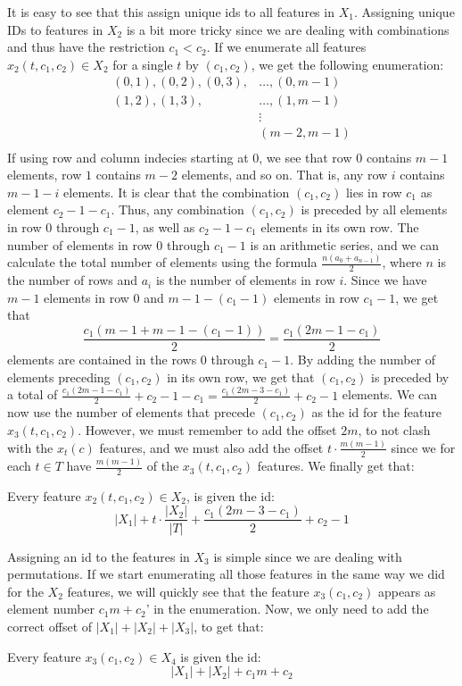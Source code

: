 It is easy to see that this assign unique ids to all features in $X_1$.
Assigning unique IDs to features in $X_2$ is a bit more tricky since we are dealing with combinations and thus have the restriction $c_1 < c_2$.
If we enumerate all features $x_2(t, c_1, c_2) \in X_2$ for a single $t$ by $(c_1, c_2)$, we get the following enumeration:
\begin{align*}
(0, 1), (0, 2), (0, 3),& \dots, (0, m-1)\\
        (1, 2), (1, 3),& \dots, (1, m-1)\\
                        & \vdots    \\
                         &      (m-2, m-1)\\                   
\end{align*}
If using row and column indecies starting at $0$, we see that row $0$ contains $m-1$ elements, row $1$ contains $m-2$ elements, and so on.
That is, any row $i$ contains $m-1-i$ elements.
It is clear that the combination $(c_1, c_2)$ lies in row $c_1$ as element $c_2 - 1 - c_1$.
Thus, any combination $(c_1, c_2)$ is preceded by all elements in row $0$ through $c_1 - 1$, as well as $c_2 - 1 - c_1$ elements in its own row.
The number of elements in row $0$ through $c_1 - 1$ is an arithmetic series, and we can calculate the total number of elements
using the formula $\frac{n(a_0 + a_{n-1})}{2}$, where $n$ is the number of rows and $a_i$ is the number of elements in row $i$.
Since we have $m-1$ elements in row $0$ and $m - 1 - (c_1 - 1)$ elements in row $c_1 - 1$,
we get that 
\[\frac{c_1(m-1 + m-1-(c_1-1))}{2} = \frac{c_1(2m-1-c_1)}{2}\] 
elements are contained in the rows $0$ through $c_1 - 1$.
By adding the number of elements preceding $(c_1, c_2)$ in its own row, we get that $(c_1, c_2)$ is preceded by a total of
$\frac{c_1(2m-1-c_1)}{2} + c_2-1-c_1 = \frac{c_1(2m-3-c_1)}{2} + c_2-1$ elements.
We can now use the number of elements that precede $(c_1, c_2)$ as the id for the feature $x_3(t, c_1, c_2)$. However, we must remember to add the offset $2m$, to not clash with the $x_t(c)$ features, and we must also add the offset $t \cdot \frac{m(m-1)}{2}$ since we for each $t \in T$ have $\frac{m(m-1)}{2}$ of the $x_3(t, c_1, c_2)$ features.
We finally get that:

\begin{center}
Every feature $x_2(t, c_1, c_2) \in X_2$, is given the id:
\[ |X_1| + t \cdot \frac{|X_2|}{|T|} + \frac{c_1(2m-3-c_1)}{2} + c_2-1\]
\end{center}

Assigning an id to the features in $X_3$ is simple since we are dealing with permutations. If we start enumerating all those features in the same way we did for the $X_2$ features, we will quickly see that the feature $x_3(c_1, c_2)$ appears as element number $c_1m+c_2$' in the enumeration.
Now, we only need to add the correct offset of $|X_1| + |X_2| + |X_3|$, to get that:
\begin{center}
Every feature $x_3(c_1, c_2) \in X_4$ is given the id:
\[|X_1| + |X_2| + c_1m+c_2\]
\end{center}

